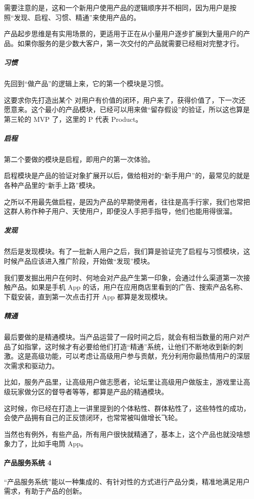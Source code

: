 \documentclass[letterpaper,11pt,english]{sphinxmanual}
\begin{document}
需要注意的是，这和一个新用户使用产品的逻辑顺序并不相同，因为用户是按照“发现、启程、习惯、精通”来使用产品的。

产品起步思维是有实用场景的，更适用于正在从小量用户逐步扩展到大量用户的产品。如果你服务的是少数大客户，第一次交付的产品就需要已经相对完整才行。


\subparagraph{习惯}
\label{\detokenize{chapter_introduction/Product:id26}}
先回到“做产品”的逻辑上来，它的第一个模块是习惯。

这要求你先打造出某个
对用户有价值的闭环，用户来了，获得价值了，下一次还愿意来。这个最小的产品模块，已经可以用来做“留存假设”的验证，所以这也算是第三轮的
MVP 了，这里的 P 代表 Product。


\subparagraph{启程}
\label{\detokenize{chapter_introduction/Product:id27}}
第二个要做的模块是启程，即用户的第一次体验。

启程模块是产品的验证对象扩展开以后，做给相对的“新手用户”的，最常见的就是各种产品里的“新手上路”模块。

之所以不用最先做启程，是因为产品的早期使用者，往往是高手行家，我们也常把这群人称作种子用户、天使用户，即便没人手把手指导，他们也能用得很溜。


\subparagraph{发现}
\label{\detokenize{chapter_introduction/Product:id28}}
然后是发现模块。有了一批新人用户之后，我们算是验证完了启程与习惯模块，这时候产品应该进入推广阶段，开始做“发现”模块。

我们要发掘出用户在何时、何地会对产品产生第一印象，会通过什么渠道第一次接触产品。如果是手机
App
的话，用户在应用商店里看到的广告、搜索产品名称、下载安装，直到第一次点击打开
App 都算是发现模块。


\subparagraph{精通}
\label{\detokenize{chapter_introduction/Product:id29}}
最后要做的是精通模块。当产品运营了一段时间之后，就会有相当数量的用户对产品了如指掌，这时候才有必要给他们打造“精通”系统，让他们不断地收到新的刺激。这是高级功能，可以考虑让高级用户参与贡献，充分利用你最热情用户的深层次需求和驱动力。

比如，服务产品里，让高级用户做志愿者，论坛里让高级用户做版主，游戏里让高级玩家做分区的督导者等等，都算是产品的精通模块。

这时候，你已经在打造上一讲里提到的个体粘性、群体粘性了，这些特性的成功，会使产品拥有自己的正反馈闭环，也常常被叫做增长飞轮。

当然也有例外，有些产品，所有用户很快就精通了，基本上，这个产品也就没啥想象力了，比如手电筒
App。


\paragraph{产品服务系统 4\sphinxfootnotemark[25]}
\label{\detokenize{chapter_introduction/Product:id30}}%
\begin{footnotetext}[25]\sphinxAtStartFootnote
{}
%
\end{footnotetext}\ignorespaces 
“产品服务系统”能以一种集成的、有针对性的方式进行产品分类，精准地满足用户需求，有助于产品的创新。
\end{document}
